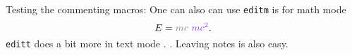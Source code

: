 Testing the commenting macros:  One can also can use \verb|editm| is for math mode \[E =
\editm{m c}{m c^2}. \]
\verb|editt| does a bit more in text mode .
.
Leaving notes is also  easy.
